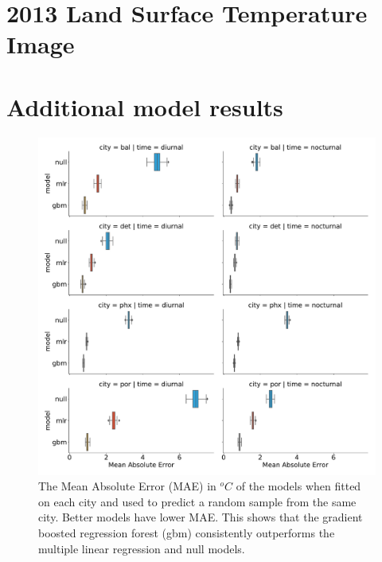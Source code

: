 \documentclass[]{elsarticle}
\begin{document}


\appendix
\section{2013 Land Surface Temperature Image}


\section{Additional model results}
\begin{figure}[h]
\begin{center}
\includegraphics[width=\textwidth]{fig/report/holdout_results_mae.pdf}
\caption{The Mean Absolute Error (MAE) in $^oC$ of the models when fitted on each city and used to predict a random sample from the same city. Better models have lower MAE. This shows that the gradient boosted regression forest (gbm) consistently outperforms the multiple linear regression and null models. }
\label{fig:cityholdout_errors}
\end{center}
\end{figure}
\end{document}
